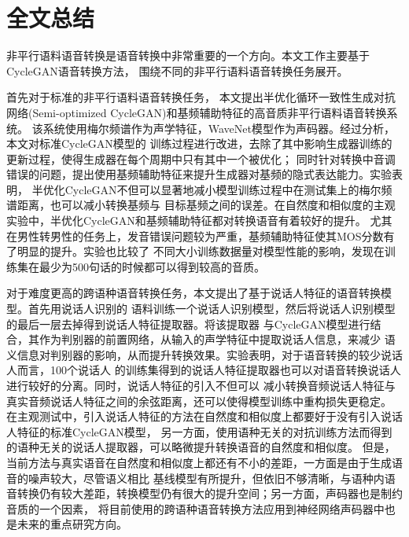 \chapter{全文总结}
非平行语料语音转换是语音转换中非常重要的一个方向。本文工作主要基于CycleGAN语音转换方法，
围绕不同的非平行语料语音转换任务展开。

首先对于标准的非平行语料语音转换任务，
本文提出半优化循环一致性生成对抗网络(Semi-optimized CycleGAN)和基频辅助特征的高音质非平行语料语音转换系统。
该系统使用梅尔频谱作为声学特征，WaveNet模型作为声码器。经过分析，本文对标准CycleGAN模型的
训练过程进行改进，去除了其中影响生成器训练的更新过程，使得生成器在每个周期中只有其中一个被优化；
同时针对转换中音调错误的问题，提出使用基频辅助特征来提升生成器对基频的隐式表达能力。实验表明，
半优化CycleGAN不但可以显著地减小模型训练过程中在测试集上的梅尔频谱距离，也可以减小转换基频与
目标基频之间的误差。在自然度和相似度的主观实验中，半优化CycleGAN和基频辅助特征都对转换语音有着较好的提升。
尤其在男性转男性的任务上，发音错误问题较为严重，基频辅助特征使其MOS分数有了明显的提升。实验也比较了
不同大小训练数据量对模型性能的影响，发现在训练集在最少为500句话的时候都可以得到较高的音质。

对于难度更高的跨语种语音转换任务，本文提出了基于说话人特征的语音转换模型。首先用说话人识别的
语料训练一个说话人识别模型，然后将说话人识别模型的最后一层去掉得到说话人特征提取器。将该提取器
与CycleGAN模型进行结合，其作为判别器的前置网络，从输入的声学特征中提取说话人信息，来减少
语义信息对判别器的影响，从而提升转换效果。实验表明，对于语音转换的较少说话人而言，100个说话人
的训练集得到的说话人特征提取器也可以对语音转换说话人进行较好的分离。同时，说话人特征的引入不但可以
减小转换音频说话人特征与真实音频说话人特征之间的余弦距离，还可以使得模型训练中重构损失更稳定。
在主观测试中，引入说话人特征的方法在自然度和相似度上都要好于没有引入说话人特征的标准CycleGAN模型，
另一方面，使用语种无关的对抗训练方法而得到的语种无关的说话人提取器，可以略微提升转换语音的自然度和相似度。
但是，当前方法与真实语音在自然度和相似度上都还有不小的差距，一方面是由于生成语音的噪声较大，尽管语义相比
基线模型有所提升，但依旧不够清晰，与语种内语音转换仍有较大差距，转换模型仍有很大的提升空间；另一方面，声码器也是制约音质的一个因素，
将目前使用的跨语种语音转换方法应用到神经网络声码器中也是未来的重点研究方向。